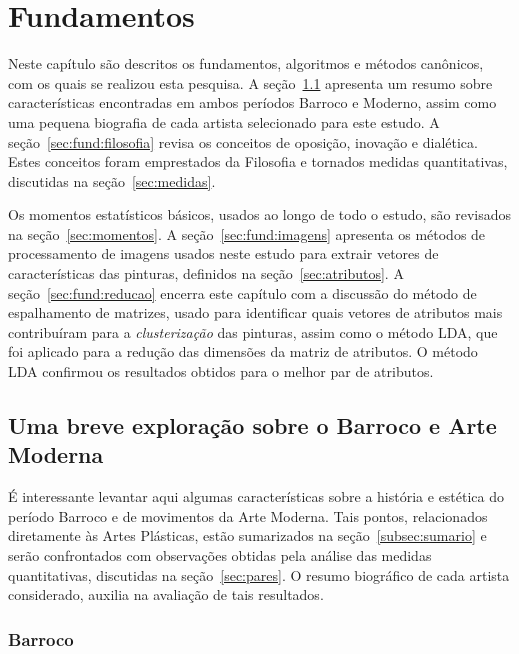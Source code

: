 
\afterpage{\blankpage}
\chapter{Fundamentos}
\label{cap:fundamentos}

Neste capítulo são descritos os fundamentos, algoritmos e métodos
canônicos, com os quais se realizou esta pesquisa. A
seção~\ref{sec:breve} apresenta um resumo sobre características
encontradas em ambos períodos Barroco e Moderno, assim como uma
pequena biografia de cada artista selecionado para este estudo. A
seção~\ref{sec:fund:filosofia} revisa os conceitos de oposição,
inovação e dialética. Estes conceitos foram emprestados da Filosofia e
tornados medidas quantitativas, discutidas na seção~\ref{sec:medidas}.

Os momentos estatísticos básicos, usados ao longo de todo o estudo,
são revisados na seção~\ref{sec:momentos}. A
seção~\ref{sec:fund:imagens} apresenta os métodos de processamento de
imagens usados neste estudo para extrair vetores de características
das pinturas, definidos na seção~\ref{sec:atributos}. A
seção~\ref{sec:fund:reducao} encerra este capítulo com a discussão do
método de espalhamento de matrizes, usado para identificar quais
vetores de atributos mais contribuíram para a \textit{clusterização}
das pinturas, assim como o método LDA, que foi aplicado para a redução
das dimensões da matriz de atributos. O método LDA confirmou os
resultados obtidos para o melhor par de atributos.

\section{Uma breve exploração sobre o Barroco e Arte Moderna}
\label{sec:breve}

É interessante levantar aqui algumas características sobre a história
e estética do período Barroco e de movimentos da Arte Moderna. Tais
pontos, relacionados diretamente às Artes Plásticas, estão sumarizados
na seção~\ref{subsec:sumario} e serão confrontados com observações
obtidas pela análise das medidas quantitativas, discutidas na
seção~\ref{sec:pares}. O resumo biográfico de cada artista
considerado, auxilia na avaliação de tais resultados.

\subsection{Barroco}

